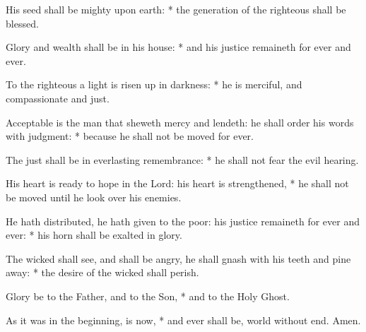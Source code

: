 ﻿\item His seed shall be mighty upon earth: * the generation of the righteous shall be blessed.
\item  Glory and wealth shall be in his house: * and his justice remaineth for ever and ever.
\item  To the righteous a light is risen up in darkness: * he is merciful, and compassionate and just.
\item  Acceptable is the man that sheweth mercy and lendeth: he shall order his words with judgment: * because he shall not be moved for ever.
\item  The just shall be in everlasting remembrance: * he shall not fear the evil hearing.
\item  His heart is ready to hope in the Lord: his heart is strengthened, * he shall not be moved until he look over his enemies.
\item  He hath distributed, he hath given to the poor: his justice remaineth for ever and ever: * his horn shall be exalted in glory.
\item  The wicked shall see, and shall be angry, he shall gnash with his teeth and pine away: * the desire of the wicked shall perish.
\item  Glory be to the Father, and to the Son, * and to the Holy Ghost.
\item  As it was in the beginning, is now, * and ever shall be, world without end. Amen.

